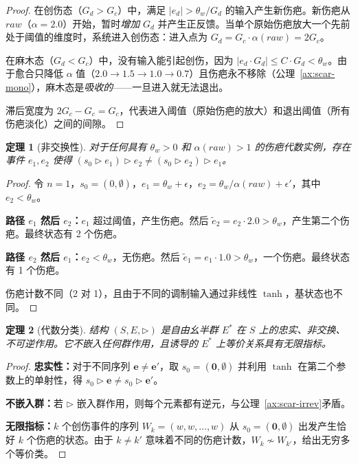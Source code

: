 \documentclass[11pt]{article}
\newtheorem{theorem}{定理}[section]
\begin{document}
\begin{proof}
在创伤态（$G_d > G_c$）中，满足 $|e_d| > \theta_w / G_d$ 的输入产生新伤疤。新伤疤从 $raw$（$\alpha = 2.0$）开始，暂时\emph{增加} $G_d$ 并产生正反馈。当单个原始伤疤放大一个先前处于阈值的维度时，系统进入创伤态：进入点为 $G_d = G_c \cdot \alpha(raw) = 2G_c$。

在麻木态（$G_d < G_c$）中，没有输入能引起创伤，因为 $|e_d \cdot G_d| \leq C \cdot G_d < \theta_w$。由于愈合只降低 $\alpha$ 值（$2.0 \to 1.5 \to 1.0 \to 0.7$）且伤疤永不移除（公理~\ref{ax:scar-mono}），麻木态是\emph{吸收的}——一旦进入就无法退出。

滞后宽度为 $2G_c - G_c = G_c$，代表进入阈值（原始伤疤的放大）和退出阈值（所有伤疤淡化）之间的间隙。
\end{proof}

\begin{theorem}[非交换性]
\label{thm:scar-noncommute}
对于任何具有 $\theta_w > 0$ 和 $\alpha(raw) > 1$ 的伤疤代数实例，存在事件 $e_1, e_2$ 使得 $(s_0 \triangleright e_1) \triangleright e_2 \neq (s_0 \triangleright e_2) \triangleright e_1$。
\end{theorem}

\begin{proof}
令 $n=1$，$s_0 = (0, \emptyset)$，$e_1 = \theta_w + \epsilon$，$e_2 = \theta_w / \alpha(raw) + \epsilon'$，其中 $e_2 < \theta_w$。

\textbf{路径 $e_1$ 然后 $e_2$：}$e_1$ 超过阈值，产生伤疤。然后 $\tilde{e}_2 = e_2 \cdot 2.0 > \theta_w$，产生第二个伤疤。最终状态有 2 个伤疤。

\textbf{路径 $e_2$ 然后 $e_1$：}$e_2 < \theta_w$，无伤疤。然后 $\tilde{e}_1 = e_1 \cdot 1.0 > \theta_w$，一个伤疤。最终状态有 1 个伤疤。

伤疤计数不同（2 对 1），且由于不同的调制输入通过非线性 $\tanh$，基状态也不同。
\end{proof}

\begin{theorem}[代数分类]
\label{thm:scar-algebra-class}
结构 $(S, E, \triangleright)$ 是自由幺半群 $E^*$ 在 $S$ 上的忠实、非交换、不可逆作用。它不嵌入任何群作用，且诱导的 $E^*$ 上等价关系具有无限指标。
\end{theorem}

\begin{proof}
\textbf{忠实性：}对于不同序列 $\mathbf{e} \neq \mathbf{e}'$，取 $s_0 = (\mathbf{0}, \emptyset)$ 并利用 $\tanh$ 在第二个参数上的单射性，得 $s_0 \triangleright \mathbf{e} \neq s_0 \triangleright \mathbf{e}'$。

\textbf{不嵌入群：}若 $\triangleright$ 嵌入群作用，则每个元素都有逆元，与公理~\ref{ax:scar-irrev}矛盾。

\textbf{无限指标：}$k$ 个创伤事件的序列 $W_k = (w, w, \ldots, w)$ 从 $s_0 = (\mathbf{0}, \emptyset)$ 出发产生恰好 $k$ 个伤疤的状态。由于 $k \neq k'$ 意味着不同的伤疤计数，$W_k \not\sim W_{k'}$，给出无穷多个等价类。
\end{proof}
\end{document}
